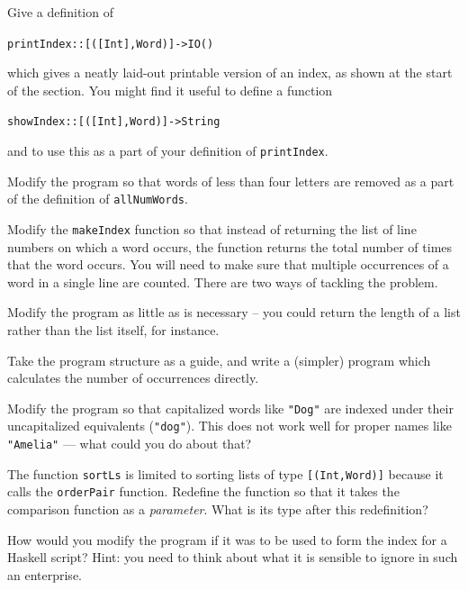 \begin{exercises}
\item
Give a definition of
\begin{alltt}
printIndex :: [ ([Int],Word) ] -> IO ()
\end{alltt}
which gives a neatly laid-out printable version of an index, as shown at
the start of the section. You might find it useful to define a function 
\begin{alltt}
showIndex :: [ ([Int],Word) ] -> String
\end{alltt}
and to use this as a part of your definition of \texttt{printIndex}.

\item 
Modify the program so that words of less than four letters are removed
as a part of the
definition of \texttt{allNumWords}.

\item 
Modify the \texttt{makeIndex} function so that instead of
returning the list of line numbers on which a word occurs, the function
returns
the total number of times that the word occurs. You will need to make
sure that multiple occurrences of a word in a single line are counted. There
are two ways of tackling the problem.
\begin{titemize}
\item Modify the program as little as is necessary -- you could return the
length of a list rather than the list itself, for instance.
\item Take the program structure as a guide, and write a (simpler) program
which calculates the number of occurrences directly.
\end{titemize}

\item
Modify the program so that capitalized words like \texttt{"Dog"} are indexed under
their uncapitalized equivalents (\texttt{"dog"}). This does not work well for
proper names like \texttt{"Amelia"} --- what could you do about that?

\item
The function \texttt{sortLs} is limited to sorting lists of type 
\texttt{[(Int,Word)]} because it calls the \texttt{orderPair} function. Redefine the
function so that it takes the comparison function as a {\em parameter}. What is
its type after this redefinition?

\item 
How would you modify the program if it was to be used to form the index
for a Haskell script? Hint: you need to think about what it is sensible to
ignore in such an enterprise.
\end{exercises}



